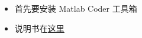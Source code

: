 
\begin{itemize}
\item 首先要安装 Matlab Coder 工具箱
\item 说明书在\href{https://ch.mathworks.com/help/coder/index.html?s_tid=CRUX_lftnav}{这里}
\end{itemize}
